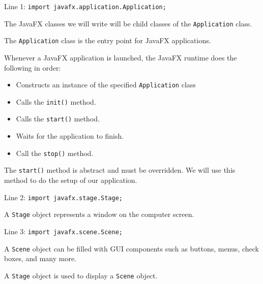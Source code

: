 \documentclass{beamer}
\newcommand{\mil}[1]{\texttt{#1}}
\begin{document}
\begin{frame}[fragile]

    Line 1:  \mil{import javafx.application.Application;}
    
    \bigskip
    
    The JavaFX classes we will write will be child classes of the \mil{Application} class.
    
    \bigskip
    
    The \mil{Application} class is the entry point for JavaFX applications.
    
    \bigskip
    
    Whenever a JavaFX application is launched, the JavaFX runtime does the following in order:
    
    \begin{itemize}
        \item Constructs an instance of the specified \mil{Application} class
        \item Calls the \mil{init()} method.
        \item Calls the \mil{start()} method.
        \item Waits for the application to finish.
        \item Call the \mil{stop()} method.
    \end{itemize}
    
    \bigskip
    
    The \mil{start()} method is abstract and must be overridden.  We will use this method to do the setup of our application.
    
\end{frame}

\begin{frame}[fragile]

    Line 2:  \mil{import javafx.stage.Stage;}
    
    \bigskip
    
    A \mil{Stage} object represents a window on the computer screen. 
    
\end{frame}

\begin{frame}[fragile]

    Line 3:    \mil{import javafx.scene.Scene;}
      
    \bigskip
    
     A \mil{Scene} object can be filled with GUI components such as buttons, menus, check boxes, and many more.
    
    \bigskip
    
     A \mil{Stage} object is used to display a \mil{Scene} object.
     
\end{frame}
\end{document}
